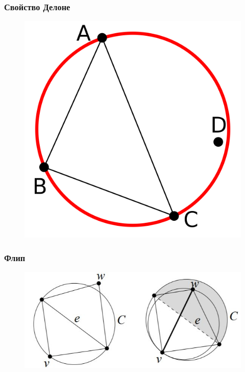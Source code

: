 \documentclass[10pt, unicode]{beamer}
\begin{document}
    \begin{frame}
        \frametitle{Свойство Делоне}
        \begin{figure}[H]
            \centering
            \includegraphics[scale=0.2]{DelaunayProperty.png}
        \end{figure}
    \end{frame}
    \begin{frame}
        \frametitle{Флип}
        \begin{figure}[H]
            \centering
            \includegraphics[width=\linewidth, keepaspectratio]{FlipLemma.jpg}
        \end{figure}
    \end{frame}
\end{document}
